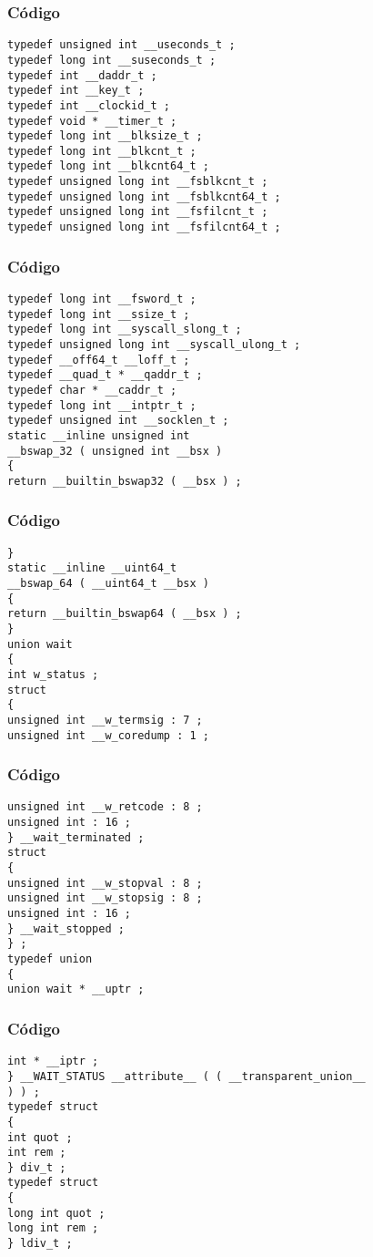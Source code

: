 \documentclass{beamer}
\begin{document}
\begin{frame}[fragile]
\frametitle{C\'odigo}
\begin{verbatim}
typedef unsigned int __useconds_t ; 
typedef long int __suseconds_t ; 
typedef int __daddr_t ; 
typedef int __key_t ; 
typedef int __clockid_t ; 
typedef void * __timer_t ; 
typedef long int __blksize_t ; 
typedef long int __blkcnt_t ; 
typedef long int __blkcnt64_t ; 
typedef unsigned long int __fsblkcnt_t ; 
typedef unsigned long int __fsblkcnt64_t ; 
typedef unsigned long int __fsfilcnt_t ; 
typedef unsigned long int __fsfilcnt64_t ; 
\end{verbatim}
\end{frame}
\begin{frame}[fragile]
\frametitle{C\'odigo}
\begin{verbatim}
typedef long int __fsword_t ; 
typedef long int __ssize_t ; 
typedef long int __syscall_slong_t ; 
typedef unsigned long int __syscall_ulong_t ; 
typedef __off64_t __loff_t ; 
typedef __quad_t * __qaddr_t ; 
typedef char * __caddr_t ; 
typedef long int __intptr_t ; 
typedef unsigned int __socklen_t ; 
static __inline unsigned int 
__bswap_32 ( unsigned int __bsx ) 
{ 
return __builtin_bswap32 ( __bsx ) ; 
\end{verbatim}
\end{frame}
\begin{frame}[fragile]
\frametitle{C\'odigo}
\begin{verbatim}
} 
static __inline __uint64_t 
__bswap_64 ( __uint64_t __bsx ) 
{ 
return __builtin_bswap64 ( __bsx ) ; 
} 
union wait 
{ 
int w_status ; 
struct 
{ 
unsigned int __w_termsig : 7 ; 
unsigned int __w_coredump : 1 ; 
\end{verbatim}
\end{frame}
\begin{frame}[fragile]
\frametitle{C\'odigo}
\begin{verbatim}
unsigned int __w_retcode : 8 ; 
unsigned int : 16 ; 
} __wait_terminated ; 
struct 
{ 
unsigned int __w_stopval : 8 ; 
unsigned int __w_stopsig : 8 ; 
unsigned int : 16 ; 
} __wait_stopped ; 
} ; 
typedef union 
{ 
union wait * __uptr ; 
\end{verbatim}
\end{frame}
\begin{frame}[fragile]
\frametitle{C\'odigo}
\begin{verbatim}
int * __iptr ; 
} __WAIT_STATUS __attribute__ ( ( __transparent_union__ 
) ) ; 
typedef struct 
{ 
int quot ; 
int rem ; 
} div_t ; 
typedef struct 
{ 
long int quot ; 
long int rem ; 
} ldiv_t ; 
\end{verbatim}
\end{frame}
\end{document}
